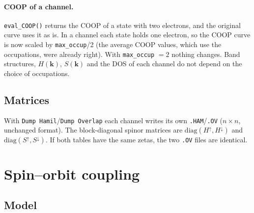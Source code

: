 \documentclass[11pt,a4paper]{article}
\newcommand{\fn}[1]{\texttt{#1()}}
\newcommand{\var}[1]{\texttt{#1}}
\begin{document}
\paragraph{COOP of a channel.} \fn{eval\_COOP} returns the COOP of a state with two
electrons, and the original curve uses it as is. In a channel each state holds one
electron, so the COOP curve is now scaled by \var{max\_occup}/2 (the average COOP values,
which use the occupations, were already right). With \var{max\_occup} $=2$ nothing
changes. Band structures, $H(\mathbf{k})$, $S(\mathbf{k})$ and the DOS of each channel do
not depend on the choice of occupations.

\subsection{Matrices}

With \texttt{Dump Hamil}/\texttt{Dump Overlap} each channel writes its own
\texttt{.HAM}/\texttt{.OV} ($n\times n$, unchanged format). The block-diagonal spinor
matrices are $\mathrm{diag}(H^\uparrow,H^\downarrow)$ and
$\mathrm{diag}(S^\uparrow,S^\downarrow)$. If both tables have the same zetas, the two
\texttt{.OV} files are identical.

\section{Spin--orbit coupling}\label{sec:soc}

\subsection{Model}
\end{document}
